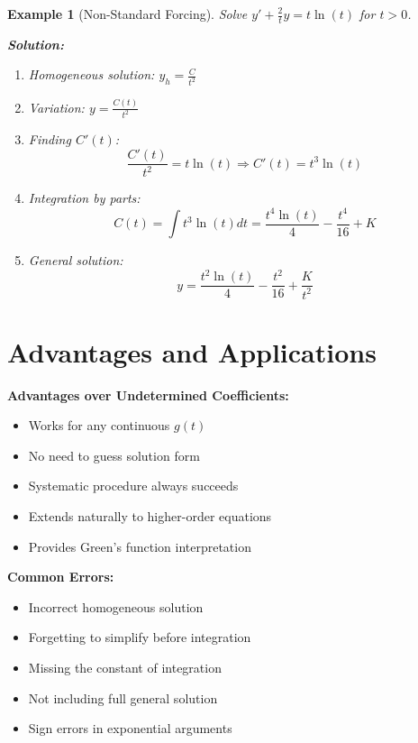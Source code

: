 \documentclass[12pt]{article}
\newtheorem{example}{Example}
\begin{document}
\begin{example}[Non-Standard Forcing]
Solve $y' + \frac{2}{t}y = t\ln(t)$ for $t > 0$.

\textbf{Solution:}
\begin{enumerate}
    \item Homogeneous solution: $y_h = \frac{C}{t^2}$
    \item Variation: $y = \frac{C(t)}{t^2}$
    \item Finding $C'(t)$:
    \[\frac{C'(t)}{t^2} = t\ln(t) \Rightarrow C'(t) = t^3\ln(t)\]
    \item Integration by parts:
    \[C(t) = \int t^3\ln(t)dt = \frac{t^4\ln(t)}{4} - \frac{t^4}{16} + K\]
    \item General solution:
    \[y = \frac{t^2\ln(t)}{4} - \frac{t^2}{16} + \frac{K}{t^2}\]
\end{enumerate}
\end{example}

\section{Advantages and Applications}

\begin{keypoint}
\textbf{Advantages over Undetermined Coefficients:}
\begin{itemize}
    \item Works for any continuous $g(t)$
    \item No need to guess solution form
    \item Systematic procedure always succeeds
    \item Extends naturally to higher-order equations
    \item Provides Green's function interpretation
\end{itemize}
\end{keypoint}

\begin{warning}
\textbf{Common Errors:}
\begin{itemize}
    \item Incorrect homogeneous solution
    \item Forgetting to simplify before integration
    \item Missing the constant of integration
    \item Not including full general solution
    \item Sign errors in exponential arguments
\end{itemize}
\end{warning}
\end{document}
